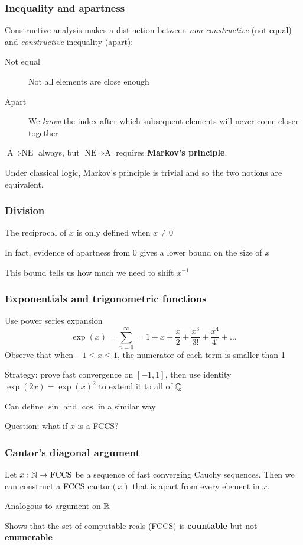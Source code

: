 \documentclass{beamer}
\begin{document}
\begin{frame}
    \frametitle{Inequality and apartness}
    Constructive analysis makes a distinction between \emph{non-constructive} (not-equal) and \emph{constructive} inequality (apart):
    \begin{description}
        \item[Not equal] Not all elements are close enough
        \item[Apart] We \emph{know} the index after which subsequent elements will never come closer together
    \end{description}
    $\textrm{A} \Rightarrow \textrm{NE}$ always, but $\textrm{NE} \Rightarrow \textrm{A}$ requires \textbf{Markov's principle}.

    Under classical logic, Markov's principle is trivial and so the two notions are equivalent.
\end{frame}

\begin{frame}
    \frametitle{Division}
    The reciprocal of $x$ is only defined when $x \neq 0$

    In fact, evidence of apartness from 0 gives a lower bound on the size of $x$

    This bound tells us how much we need to shift $x^{-1}$
\end{frame}

\begin{frame}
    \frametitle{Exponentials and trigonometric functions}
    Use power series expansion
    \[
        \exp(x) = \sum_{n=0}^\infty = 1 + x + \frac{x}{2}
        + \frac{x^3}{3!} + \frac{x^4}{4!} + \dots
    \]
    Observe that when $-1 \leq x \leq 1$, the numerator of each term is smaller than 1

    Strategy: prove fast convergence on $[-1,1]$, then use identity $\exp(2x) = \exp(x)^2$ to extend it to all of $\mathbb{Q}$

    Can define $\sin$ and $\cos$ in a similar way

    Question: what if $x$ is a FCCS?
\end{frame}

\begin{frame}
    \frametitle{Cantor's diagonal argument}
    \begin{Theorem}
        Let $x : \mathbb{N} \rightarrow \mathrm{FCCS}$ be a sequence of fast converging Cauchy sequences. Then we can construct a FCCS $\mathrm{cantor}(x)$ that is apart from every element in $x$.
    \end{Theorem}

    Analogous to argument on $\mathbb{R}$

    Shows that the set of computable reals (FCCS) is \textbf{countable} but not \textbf{enumerable}
\end{frame}
\end{document}
